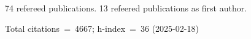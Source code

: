 74 refereed publications. 13 refeered publications as first author.

Total citations~=~4667; h-index~=~36 (2025-02-18)